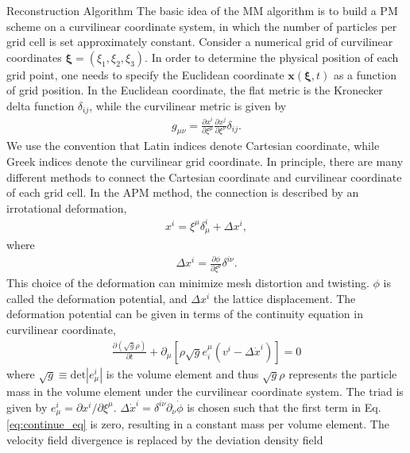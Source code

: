 \begin{section}{Reconstruction Algorithm}
  \label{sec:reconstruction}
   The basic idea of the MM algorithm is to build a PM scheme on a curvilinear coordinate system, 
in which the number of particles per grid cell is set approximately constant. 
    Consider a numerical grid of curvilinear coordinates 
$\bm{\xi}=\left(\xi_1,\xi_2,\xi_3\right)$. In order to determine the physical position 
of each grid point, one needs to specify the Euclidean coordinate $\bm{x}(\bm{\xi},t)$ 
as a function of grid position. In the Euclidean coordinate, the flat metric is the Kronecker 
delta function $\delta_{ij}$, while the curvilinear metric is given by
\begin{align}
    g_{\mu\nu}=\frac{\partial x^i}{\partial \xi ^\mu} \frac{\partial x^j}{\partial \xi ^\nu}\delta_{ij}.
\end{align}
    We use the convention that Latin indices denote Cartesian coordinate, 
while Greek indices denote the curvilinear grid coordinate.
    In principle, there are many different methods to connect the Cartesian 
coordinate and curvilinear coordinate of each grid cell. In the APM method, the 
connection is described by an irrotational deformation,
\begin{align}
    x^i=\xi ^\mu \delta ^i _\mu + \Delta x^i,
\end{align}
where
\begin{align}
 \label{eq:disp}
    \Delta x^i=\frac{\partial \phi}{\partial \xi ^ \nu}\delta ^{i \nu} .
\end{align}
    This choice of the deformation can minimize mesh distortion and twisting. $\phi$ is called 
the deformation potential, and $\Delta x^i$ the lattice displacement. The deformation potential 
can be given in terms of the continuity equation in curvilinear coordinate,
\begin{align}
 \label{eq:continue_eq}
    \frac{\partial (\sqrt{g} \rho) }{\partial t}+\partial_\mu \left[\rho \sqrt{g} e^\mu _i \left(v^i - \Delta \dot{x}^i \right) \right] =0
\end{align}
where $\sqrt{g} \equiv \mathrm{det}\left| e^i_\mu\right|$ is the volume element 
and thus $\sqrt{g} \rho$ represents the particle mass in the volume element under the curvilinear 
coordinate system. The triad is given by $e^i_\mu = \partial x^i / \partial \xi ^ \mu$. 
$\Delta \dot{x}^i=\delta ^{i\nu}\partial _\nu \dot{\phi}$ is chosen such that the first 
term in Eq.\ref{eq:continue_eq} is zero, resulting in a constant mass per volume 
element. The velocity field divergence is replaced by the deviation density field 

\end{section}
